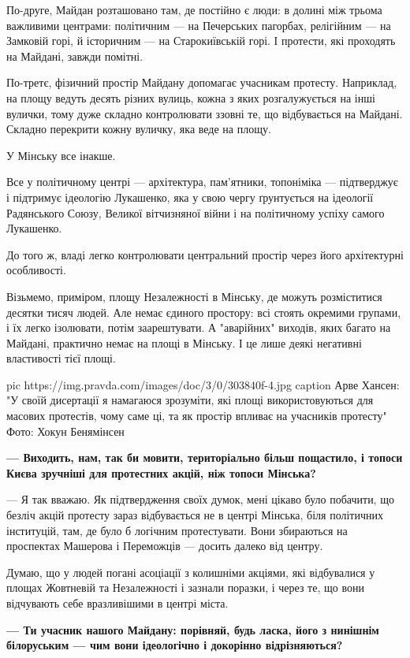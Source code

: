 По-друге, Майдан розташовано там, де постійно є люди: в долині між трьома
важливими центрами: політичним — на Печерських пагорбах, релігійним — на
Замковій горі, й історичним — на Старокиївській горі. І протести, які проходять
на Майдані, завжди помітні. 

По-третє, фізичний простір Майдану допомагає учасникам протесту. Наприклад, на
площу ведуть десять різних вулиць, кожна з яких розгалужується на інші вулички,
тому дуже складно контролювати ззовні те, що відбувається на Майдані. Складно
перекрити кожну вуличку, яка веде на площу.

У Мінську все інакше.

Все у політичному центрі — архітектура, пам’ятники, топоніміка — підтверджує і
підтримує ідеологію Лукашенко, яка у свою чергу ґрунтується на ідеології
Радянського Союзу, Великої вітчизняної війни і на політичному успіху самого
Лукашенко.

До того ж, владі легко контролювати центральний простір через його архітектурні
особливості. 

Візьмемо, приміром, площу Незалежності в Мінську, де можуть розміститися
десятки тисяч людей. Але немає єдиного простору: всі стоять окремими групами, і
їх легко ізолювати, потім заарештувати. А "аварійних" виходів, яких багато на
Майдані, практично немає на площі в Мінську. І це лише деякі негативні
властивості тієї площі. 

\ifcmt
pic https://img.pravda.com/images/doc/3/0/303840f-4.jpg
caption Арве Хансен: "У своїй дисертації я намагаюся зрозуміти, які площі використовуються для масових протестів, чому саме ці, та як простір впливає на учасників протесту" Фото: Хокун Бенямінсен
\fi

\textbf{— Виходить, нам, так би мовити, територіально більш пощастило, і топоси Києва
зручніші для протестних акцій, ніж топоси Мінська?} 

— Я так вважаю. Як підтвердження своїх думок, мені цікаво було побачити, що
безліч акцій протесту зараз відбувається не в центрі Мінська, біля політичних
інституцій, там, де було б логічним протестувати. Вони збираються на проспектах
Машерова і Переможців — досить далеко від центру. 

Думаю, що у людей погані асоціації з колишніми акціями, які відбувалися у
площах Жовтневій та Незалежності і зазнали поразки, і через те, що вони
відчувають себе вразливішими в центрі міста. 

\textbf{— Ти учасник нашого Майдану: порівняй, будь ласка, його з нинішнім білоруським
— чим вони ідеологічно і докорінно відрізняються?} 

